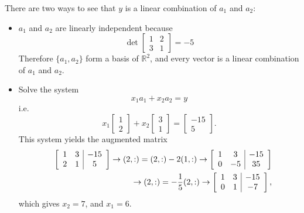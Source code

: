 There are two ways to see that $y$ is a linear combination of $a_1$ and $a_2$:
\begin{itemize}
  \item $a_1$ and $a_2$ are linearly independent because
	$$
	\det\left[\begin{array}{cc}
	            1&2 \\ 3&1
	          \end{array}\right] = -5
	$$
	Therefore $\{a_1,a_2\}$ form a basis of $\mathbb{R}^2$, and every vector is a linear combination of $a_1$ and $a_2$.
	\item Solve the system
	$$
	x_1a_1+x_2a_2 = y
	$$
	i.e.
	$$
x_1\left[\begin{array}{c}1\\2\end{array}\right] + x_2\left[\begin{array}{c}3\\1\end{array}\right] = \left[\begin{array}{c}-15\\5\end{array}\right].
	$$
	This system yields the augmented matrix
\begin{eqnarray*}
&&\left[\begin{array}{cc|c}1&3&-15\\2&1&5\end{array}\right]\rightarrow (2,:)=(2,:)-2(1,:)\rightarrow \left[\begin{array}{cc|c}1&3&-15\\0&-5&35\end{array}\right]\\
&&\rightarrow (2,:)=-\frac{1}{5}(2,:)\rightarrow \left[\begin{array}{cc|c}1&3&-15\\0&1&-7\end{array}\right],
\end{eqnarray*}
which gives $x_2=7$, and $x_1 = 6$.
	
\end{itemize}


